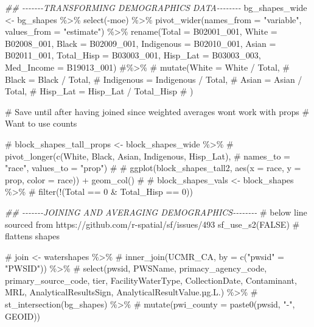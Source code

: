 \documentclass[
  letterpaper,
  DIV=11,
  numbers=noendperiod]{scrartcl}
\newenvironment{Shaded}{\begin{snugshade}}{\end{snugshade}}
\newcommand{\AttributeTok}[1]{\textcolor[rgb]{0.40,0.45,0.13}{#1}}
\newcommand{\CommentTok}[1]{\textcolor[rgb]{0.37,0.37,0.37}{#1}}
\newcommand{\ConstantTok}[1]{\textcolor[rgb]{0.56,0.35,0.01}{#1}}
\newcommand{\DocumentationTok}[1]{\textcolor[rgb]{0.37,0.37,0.37}{\textit{#1}}}
\newcommand{\FunctionTok}[1]{\textcolor[rgb]{0.28,0.35,0.67}{#1}}
\newcommand{\NormalTok}[1]{\textcolor[rgb]{0.00,0.23,0.31}{#1}}
\newcommand{\OtherTok}[1]{\textcolor[rgb]{0.00,0.23,0.31}{#1}}
\newcommand{\SpecialCharTok}[1]{\textcolor[rgb]{0.37,0.37,0.37}{#1}}
\newcommand{\StringTok}[1]{\textcolor[rgb]{0.13,0.47,0.30}{#1}}
\begin{document}
\begin{Shaded}
\begin{Highlighting}[]
\DocumentationTok{\#\# {-}{-}{-}{-}{-}{-}{-}TRANSFORMING DEMOGRAPHICS DATA{-}{-}{-}{-}{-}{-}{-}{-}}
\NormalTok{bg\_shapes\_wide }\OtherTok{\textless{}{-}}\NormalTok{ bg\_shapes }\SpecialCharTok{\%\textgreater{}\%} 
  \FunctionTok{select}\NormalTok{(}\SpecialCharTok{{-}}\NormalTok{moe) }\SpecialCharTok{\%\textgreater{}\%} 
  \FunctionTok{pivot\_wider}\NormalTok{(}\AttributeTok{names\_from =} \StringTok{"variable"}\NormalTok{, }\AttributeTok{values\_from =} \StringTok{"estimate"}\NormalTok{) }\SpecialCharTok{\%\textgreater{}\%} 
  \FunctionTok{rename}\NormalTok{(}\AttributeTok{Total =}\NormalTok{ B02001\_001,    }
         \AttributeTok{White =}\NormalTok{ B02008\_001,    }
         \AttributeTok{Black =}\NormalTok{ B02009\_001,}
         \AttributeTok{Indigenous =}\NormalTok{ B02010\_001,   }
         \AttributeTok{Asian =}\NormalTok{ B02011\_001,}
         \AttributeTok{Total\_Hisp =}\NormalTok{ B03003\_001,   }
         \AttributeTok{Hisp\_Lat =}\NormalTok{ B03003\_003,}
         \AttributeTok{Med\_Income =}\NormalTok{ B19013\_001) }\CommentTok{\#\%\textgreater{}\% }
\CommentTok{\# mutate(White = White / Total,}
\CommentTok{\#        Black = Black / Total,}
\CommentTok{\#        Indigenous = Indigenous / Total,}
\CommentTok{\#        Asian = Asian / Total,}
\CommentTok{\#        Hisp\_Lat = Hisp\_Lat / Total\_Hisp}
\CommentTok{\#        )}

\CommentTok{\# Save until after having joined since weighted averages won\textquotesingle{}t work with props}
\CommentTok{\# Want to use counts}

\CommentTok{\# block\_shapes\_tall\_props \textless{}{-} block\_shapes\_wide \%\textgreater{}\% }
\CommentTok{\#   pivot\_longer(c(White, Black, Asian, Indigenous, Hisp\_Lat), }
\CommentTok{\#                names\_to = "race", values\_to = "prop")}
\CommentTok{\# }
\CommentTok{\# ggplot(block\_shapes\_tall2, aes(x = race, y = prop, color = race)) + geom\_col()}
\CommentTok{\# }
\CommentTok{\# block\_shapes\_vals \textless{}{-} block\_shapes \%\textgreater{}\% }
\CommentTok{\#   filter(!(Total == 0 \& Total\_Hisp == 0))}

\DocumentationTok{\#\# {-}{-}{-}{-}{-}{-}{-}JOINING AND AVERAGING DEMOGRAPHICS{-}{-}{-}{-}{-}{-}{-}{-}}
\CommentTok{\# below line sourced from https://github.com/r{-}spatial/sf/issues/493}
\FunctionTok{sf\_use\_s2}\NormalTok{(}\ConstantTok{FALSE}\NormalTok{) }\CommentTok{\# flattens shapes}

\CommentTok{\# join \textless{}{-} watershapes \%\textgreater{}\% }
\CommentTok{\#   inner\_join(UCMR\_CA, by = c("pwsid" = "PWSID")) \%\textgreater{}\% }
\CommentTok{\#   select(pwsid, PWSName, primacy\_agency\_code, primary\_source\_code, tier, FacilityWaterType, CollectionDate, Contaminant, MRL, AnalyticalResultsSign, AnalyticalResultValue.µg.L.) \%\textgreater{}\% }
\CommentTok{\#   st\_intersection(bg\_shapes) \%\textgreater{}\% }
\CommentTok{\#   mutate(pwi\_county = paste0(pwsid, "{-}", GEOID))}



\end{Highlighting}
\end{Shaded}
\end{document}
